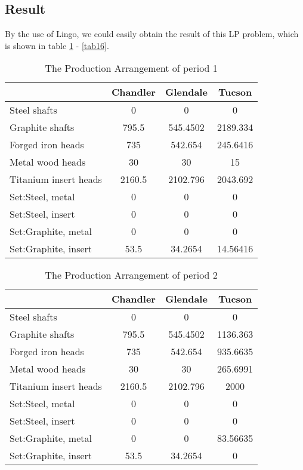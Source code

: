 \documentclass[12pt]{article}
\begin{document}
	\subsection{Result}
	By the use of Lingo, we could easily obtain the result of this LP problem, which is shown in table \ref{tab13} - \ref{tab16}.
		\begin{table}[H]
		\centering
		\setlength{\belowcaptionskip}{0.1cm}
		\caption{The Production Arrangement of period 1}
		\label{tab13}
		\begin{tabular}{lccc}
			\hline
			\hline
			&Chandler&Glendale&	Tucson\\
			\hline
			Steel shafts& 0&0&0\\
			Graphite shafts& 795.5&545.4502&2189.334\\
			Forged iron heads&735&542.654&245.6416\\
			Metal wood heads&30&30&15\\
			Titanium insert heads&2160.5&2102.796&2043.692\\
			Set:Steel, metal&0&0&0\\
			Set:Steel, insert&0&0&0\\
			Set:Graphite, metal&0&0&0\\
			Set:Graphite, insert&53.5&34.2654&14.56416\\
			\hline
			\hline
		\end{tabular}
	\end{table}
	
	\begin{table}[H]
		\centering
		\setlength{\belowcaptionskip}{0.1cm}
		\caption{The Production Arrangement of period 2}
		\label{tab14}
		\begin{tabular}{lccc}
			\hline
			\hline
			&Chandler&Glendale&	Tucson\\
			\hline
			Steel shafts& 0&0&0\\
			Graphite shafts& 795.5&545.4502&1136.363\\
			Forged iron heads&735&542.654&935.6635 \\
			Metal wood heads&30&30&265.6991\\
			Titanium insert heads&2160.5&2102.796&2000\\
			Set:Steel, metal&0&0&0\\
			Set:Steel, insert&0&0&0\\
			Set:Graphite, metal&0&0&83.56635\\
			Set:Graphite, insert&53.5&34.2654&0\\
			\hline
			\hline
		\end{tabular}
	\end{table}
\end{document}
